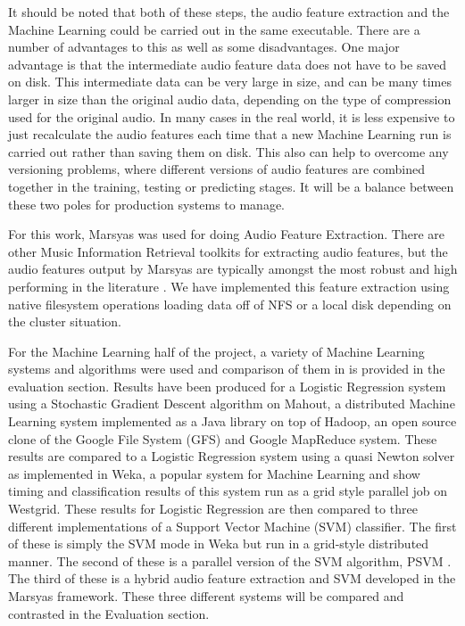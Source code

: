 \documentclass[12pt,oneside]{book}
\begin{document}
It should be noted that both of these steps, the audio feature
extraction and the Machine Learning could be carried out in the same
executable.  There are a number of advantages to this as well as some
disadvantages.  One major advantage is that the intermediate audio
feature data does not have to be saved on disk.  This intermediate
data can be very large in size, and can be many times larger in size
than the original audio data, depending on the type of compression
used for the original audio.  In many cases in the real world, it is
less expensive to just recalculate the audio features each time that a
new Machine Learning run is carried out rather than saving them on
disk.  This also can help to overcome any versioning problems, where
different versions of audio features are combined together in the
training, testing or predicting stages.  It will be a balance between
these two poles for production systems to manage.

For this work, Marsyas was used for doing Audio Feature Extraction.
There are other Music Information Retrieval toolkits for extracting
audio features, but the audio features output by Marsyas are typically
amongst the most robust and high performing in the literature
\cite{marsyas}.  We have implemented this feature extraction using
native filesystem operations loading data off of NFS or a local disk
depending on the cluster situation.

For the Machine Learning half of the project, a variety of Machine
Learning systems and algorithms were used and comparison of them in is
provided in the evaluation section.  Results have been produced for a
Logistic Regression system using a Stochastic Gradient Descent
algorithm on Mahout, a distributed Machine Learning system implemented
as a Java library on top of Hadoop, an open source clone of the Google
File System (GFS) and Google MapReduce system.  These results are
compared to a Logistic Regression system using a quasi Newton solver
as implemented in Weka, a popular system for Machine Learning and show
timing and classification results of this system run as a grid style
parallel job on Westgrid.  These results for Logistic Regression are
then compared to three different implementations of a Support Vector
Machine (SVM) classifier.  The first of these is simply the SVM mode
in Weka but run in a grid-style distributed manner.  The second of
these is a parallel version of the SVM algorithm, PSVM
\cite{chang07psvm}.  The third of these is a hybrid audio feature
extraction and SVM developed in the Marsyas framework.  These three
different systems will be compared and contrasted in the Evaluation
section.
\end{document}
